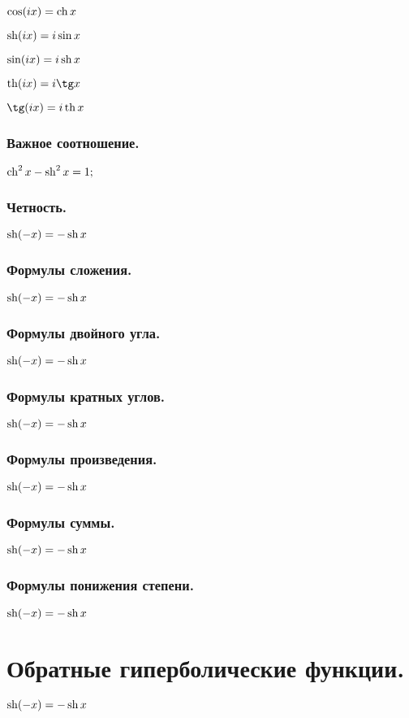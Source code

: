 $\cos (ix) = \ch x$

$\sh (ix)= i \sin x$

$\sin (ix) = i \sh x$

$\th (ix) = i \tg x$

$\tg (ix) = i \th x$

\subsubsection{Важное соотношение.}
$\ch^2 x - \sh^2 x = 1;$

\subsubsection{Четность.}

$\sh (-x) = -\sh x$

\subsubsection{Формулы сложения.}

$\sh (-x) = -\sh x$

\subsubsection{Формулы двойного угла.}

$\sh (-x) = -\sh x$
\subsubsection{Формулы кратных углов.}

$\sh (-x) = -\sh x$
\subsubsection{Формулы произведения.}

$\sh (-x) = -\sh x$
\subsubsection{Формулы суммы.}

$\sh (-x) = -\sh x$
\subsubsection{Формулы понижения степени.}

$\sh (-x) = -\sh x$
\section{Обратные гиперболические функции.}
$\sh (-x) = -\sh x$

